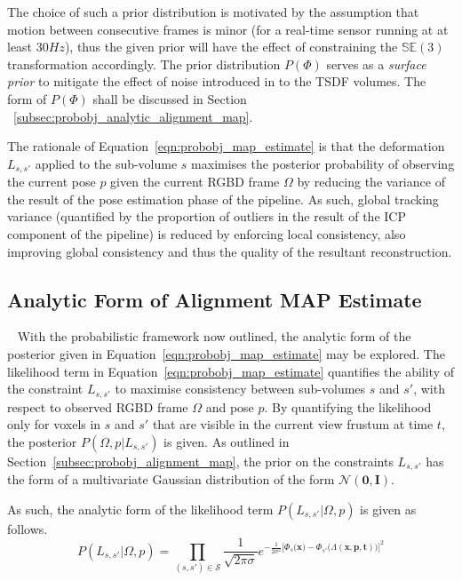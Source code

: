The choice of such a prior distribution is motivated by the assumption that motion between 
consecutive frames is minor (for a real-time sensor running at at least \( 30Hz \)),
thus the given prior will have the effect of constraining the \(\mathbb{SE}(3)\)
transformation accordingly. The prior distribution \(P(\Phi)\) serves as a
\textit{surface prior} to mitigate the effect of noise introduced in to the TSDF
volumes. The form of \(P(\Phi)\) shall be discussed in Section
~\ref{subsec:probobj_analytic_alignment_map}.

The rationale of Equation~\ref{eqn:probobj_map_estimate} is that the deformation
\(L_{s, s'}\) applied to the sub-volume \(s\) maximises the posterior probability of
observing the current pose \(p\) given the current RGBD frame \( \Omega \) by reducing
the variance of the result of the pose estimation phase of the pipeline. As such,
global tracking variance (quantified by the proportion of outliers in the result
of the ICP component of the pipeline) is reduced by enforcing local consistency,
also improving global consistency and thus the quality of the resultant
reconstruction.

\subsection{Analytic Form of Alignment MAP Estimate}
~\label{subsec:probobj_analytic_alignment_map}
With the probabilistic framework now outlined, the analytic form of the
posterior given in Equation~\ref{eqn:probobj_map_estimate} may be explored. The
likelihood term in Equation~\ref{eqn:probobj_map_estimate} quantifies the
ability of the constraint \(L_{s, s'}\) to maximise consistency between sub-volumes
\(s\) and \(s'\), with respect to observed RGBD frame \( \Omega \) and pose \(p\). By
quantifying the likelihood only for voxels in \(s\) and \(s'\) that are visible in
the current view frustum at time \(t\), the posterior \(P(\Omega, p | L_{s, s'})\)
is given. As outlined in Section~\ref{subsec:probobj_alignment_map}, the prior
on the constraints \(L_{s, s'}\) has the form of a multivariate Gaussian
distribution of the form \(\mathcal{N}(\bm{0}, \bm{I})\).

As such, the analytic form of the likelihood term \(P(L_{s, s'} | \Omega, p)\) is
given as follows.
\begin{equation}
  \label{eqn:probobj_likelihood_analytic}
  P(L_{s, s'} | \Omega, p) = \prod_{(s, s') \in \mathcal{S}}
  \frac{1}{\sqrt{2 \pi \sigma}}
  e^{-\frac{1}{2\sigma^{2}} {\Big[
      \Phi_{s}\big(\bm{x}\big) - \Phi_{s'}\big(\Lambda(\bm{x}, \bm{p}, \bm{t})\big)
    \Big]}^{2}
  }
\end{equation}

